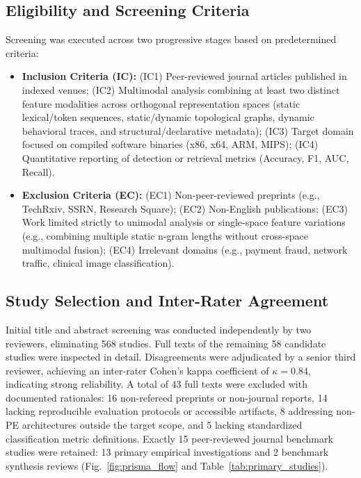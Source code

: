 \documentclass[pdflatex,sn-mathphys-num]{sn-jnl}
\begin{document}
\subsection{Eligibility and Screening Criteria}\label{sec:prisma_eligibility}
Screening was executed across two progressive stages based on predetermined criteria:
\begin{itemize}
    \item \textbf{Inclusion Criteria (IC):} (IC1) Peer-reviewed journal articles published in indexed venues; (IC2) Multimodal analysis combining at least two distinct feature modalities across orthogonal representation spaces (static lexical/token sequences, static/dynamic topological graphs, dynamic behavioral traces, and structural/declarative metadata); (IC3) Target domain focused on compiled software binaries (x86, x64, ARM, MIPS); (IC4) Quantitative reporting of detection or retrieval metrics (Accuracy, F1, AUC, Recall).
    \item \textbf{Exclusion Criteria (EC):} (EC1) Non-peer-reviewed preprints (e.g., TechRxiv, SSRN, Research Square); (EC2) Non-English publications; (EC3) Work limited strictly to unimodal analysis or single-space feature variations (e.g., combining multiple static n-gram lengths without cross-space multimodal fusion); (EC4) Irrelevant domains (e.g., payment fraud, network traffic, clinical image classification).
\end{itemize}

\subsection{Study Selection and Inter-Rater Agreement}\label{sec:prisma_selection}
Initial title and abstract screening was conducted independently by two reviewers, eliminating 568 studies. Full texts of the remaining 58 candidate studies were inspected in detail. Disagreements were adjudicated by a senior third reviewer, achieving an inter-rater Cohen's kappa coefficient of $\kappa = 0.84$, indicating strong reliability. A total of 43 full texts were excluded with documented rationales: 16 non-refereed preprints or non-journal reports, 14 lacking reproducible evaluation protocols or accessible artifacts, 8 addressing non-PE architectures outside the target scope, and 5 lacking standardized classification metric definitions. Exactly 15 peer-reviewed journal benchmark studies were retained: 13 primary empirical investigations and 2 benchmark synthesis reviews (Fig.~\ref{fig:prisma_flow} and Table~\ref{tab:primary_studies}).
\end{document}
